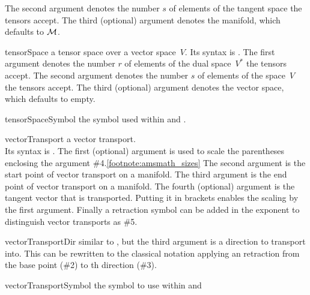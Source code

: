 \documentclass[english,a4paper,DIV=12,parskip=full,oneside]{scrartcl}
\begin{document}
\begin{commandlist}
		The second argument denotes the number $s$ of elements of the tangent space the tensors accept.
		The third (optional) argument denotes the manifold, which defaults to $\mathcal{M}$.
		\par{}
		\par{}
	\item[tensorSpace] a tensor space over a vector space~$V$.
		Its syntax is .
		The first argument denotes the number $r$ of elements of the dual space~$V^*$ the tensors accept.
		The second argument denotes the number $s$ of elements of the space~$V$ the tensors accept.
		The third (optional) argument denotes the vector space, which defaults to empty.
		\par{}
		\par{}
	\item[tensorSpaceSymbol] the symbol used within \codeCommand{\tensorSpace} and \codeCommand{\tensorBundle}.
		\par\mathCodeExample{\tensorSpaceSymbol}
	\item[vectorTransport] a vector transport.\\
		Its syntax is .
		The first (optional) argument is used to scale the parentheses enclosing the argument \#4.\cref{footnote:amsmath_sizes}
		The second argument is the start point of vector transport on a manifold.
		The third argument is the end point of vector transport on a manifold.
		The fourth (optional) argument is the tangent vector that is transported.
		Putting it in brackets enables the scaling by the first argument.
		Finally a retraction symbol can be added in the exponent to distinguish vector transports as \#5.
		\par{}
		\par{}
		\par{}
		\par{}
	\item[vectorTransportDir] similar to \codeCommand{\vectorTransport}, but the third
		argument is a direction to transport into. This can be rewritten to the classical notation
		applying an retraction from the base point (\#2) to th direction (\#3).
		\par{}
		\par{}
		\par{}
		\par{}
	\item[vectorTransportSymbol]\hspace*{2em}the symbol to use within \codeCommand{\vectorTransport} and \codeCommand{\vectorTransportDir}
		\par\mathCodeExample{\vectorTransportSymbol}
\end{commandlist}
\end{document}
